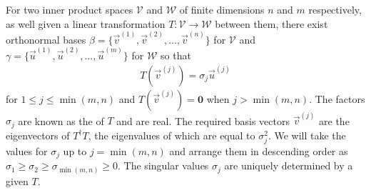 \begin{thm}
\label{thm:SVDtrans}
For two inner product spaces $\mathcal{V}$ and $\mathcal{W}$ of finite dimensions $n$ and $m$ respectively, as well given a linear transformation $T: \mathcal{V} \to \mathcal{W}$ between them, there exist orthonormal bases $\beta = \{\vec{v}^{(1)}, \vec{v}^{(2)},\ldots,\vec{v}^{(n)}\}$ for $\mathcal{V}$ and $\gamma = \{\vec{u}^{(1)}, \vec{u}^{(2)},\ldots,\vec{u}^{(m)}\}$ for $\mathcal{W}$ so that 
\begin{align}
T(\vec{v}^{(j)}) = \sigma_j \vec{u}^{(j)} \label{eqn:SVDT}
\end{align}
for $1\leq j \leq \min(m,n)$ and $T(\vec{v}^{(j)}) = \textbf{0}$ when $j > \min(m,n)$. The factors $\sigma_j$ are known as the  of $T$ and are real. The required basis vectors $\vec{v}^{(j)}$ are the eigenvectors of $T^\dag T$, the eigenvalues of which are equal to $\sigma_j^2$. We will take the values for $\sigma_j$ up to $j = \min(m,n)$ and arrange them in descending order as $\sigma_1 \geq \sigma_2 \geq \sigma_{\min(m,n)} \geq 0$. The singular values $\sigma_j$ are uniquely determined by a given $T$.
\end{thm}
